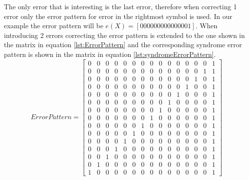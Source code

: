 \documentclass[Main]{subfiles}
\begin{document}
The only error that is interesting is the last error, therefore when correcting 1 error only the error pattern for error in the rightmost symbol is used.
In our example the error pattern will be $e(X) = [000000000000001]$.
When introducing 2 errors correcting the error pattern is extended to the one shown in the matrix in equation \ref{lst:ErrorPattern} and the corresponding syndrome error pattern is shown in the matrix in equation \ref{lst:syndromeErrorPattern}.
\begin{equation}
\label{lst:ErrorPattern}
Error Pattern = 
\begin{bmatrix}
     0 &    0 &    0 &    0 &    0 &    0 &    0  &	 0 &    0 &    0 &    0 &    0 &    0 &    0   &   1\\
     0 &    0 &    0 &    0 &    0 &    0 &    0  &	 0 &    0 &    0 &    0 &    0 &    0 &    1   &   1\\
   	 0 &    0 &    0 &    0 &    0 &    0 &    0  &	 0 &    0 &    0 &    0 &    0 &    1 &    0   &   1\\
     0 &    0 &    0 &    0 &    0 &    0 &    0  &	 0 &    0 &    0 &    0 &    1 &    0 &    0   &   1\\
     0 &    0 &    0 &    0 &    0 &    0 &    0  &	 0 &    0 &    0 &    1 &    0 &    0 &    0   &   1\\
     0 &    0 &    0 &    0 &    0 &    0 &    0  &	 0 &    0 &    1 &    0 &    0 &    0 &    0   &   1\\
     0 &    0 &    0 &    0 &    0 &    0 &    0  &	 0 &    1 &    0 &    0 &    0 &    0 &    0   &   1\\
     0 &    0 &    0 &    0 &    0 &    0 &    0  &	 1 &    0 &    0 &    0 &    0 &    0 &    0   &   1\\
     0 &    0 &    0 &    0 &    0 &    0 &    1  &	 0 &    0 &    0 &    0 &    0 &    0 &    0   &   1\\
     0 &    0 &    0 &    0 &    0 &    1 &    0  &	 0 &    0 &    0 &    0 &    0 &    0 &    0   &   1\\
     0 &    0 &    0 &    0 &    1 &    0 &    0  &	 0 &    0 &    0 &    0 &    0 &    0 &    0   &   1\\
     0 &    0 &    0 &    1 &    0 &    0 &    0  &	 0 &    0 &    0 &    0 &    0 &    0 &    0   &   1\\
     0 &    0 &    1 &    0 &    0 &    0 &    0  &	 0 &    0 &    0 &    0 &    0 &    0 &    0   &   1\\
     0 &    1 &    0 &    0 &    0 &    0 &    0  &	 0 &    0 &    0 &    0 &    0 &    0 &    0   &   1\\
     1 &    0 &    0 &    0 &    0 &    0 &    0  &	 0 &    0 &    0 &    0 &    0 &    0 &    0   &   1
\end{bmatrix}
\end{equation}
\end{document}

